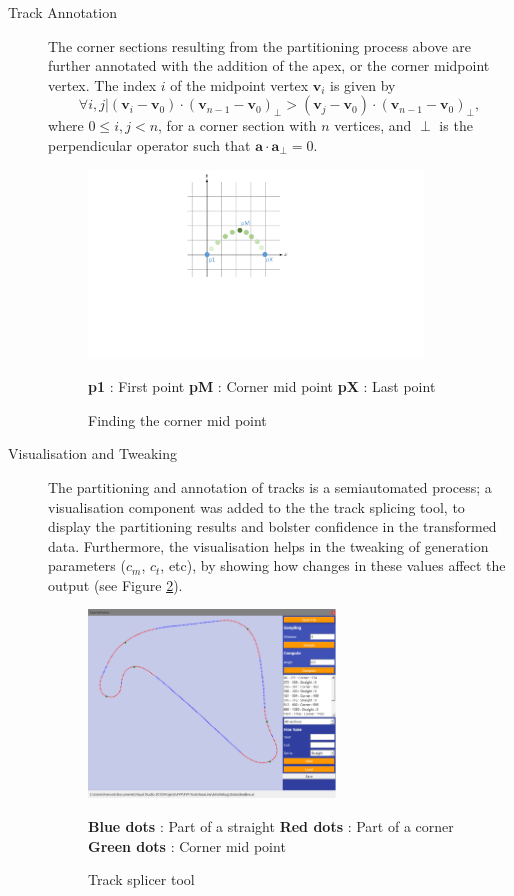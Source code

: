 \begin{description}
	\item [Track Annotation] The corner sections resulting from the partitioning process above are further annotated with the addition of the apex, or the corner midpoint vertex. The index $i$ of the midpoint vertex $\mathbf{v}_i$ is given by
	\begin{equation}
		\forall i,j | (\mathbf{v}_i - \mathbf{v}_0) \cdot (\mathbf{v}_{n-1} - \mathbf{v}_0)_{\perp} > (\mathbf{v}_j - \mathbf{v}_0) \cdot (\mathbf{v}_{n-1} - \mathbf{v}_0)_{\perp},  
	\end{equation} 
	where $0 \leq i,j < n$, for a corner section with $n$ vertices, and $\perp$ is the perpendicular operator such that $\mathbf{a} \cdot \mathbf{a}_{\perp} = 0$. 
	
	\begin{figure}[!htb]
		\centering
		\includegraphics[height=5cm]{diagrams/cornerMidPoint.pdf}
		\caption[Corner mid point]{Finding the corner mid point}
		\textbf{p1} : First point \textbf{pM} : Corner mid point \textbf{pX} : Last point
		\label{fig:diagram-cornerMidPoint}
	\end{figure}
	
	\item [Visualisation and Tweaking] The partitioning and annotation of tracks is a semiautomated process; a visualisation component was added to the the track splicing tool, to display the partitioning results and bolster confidence in the transformed data. Furthermore, the visualisation helps in the tweaking of generation parameters ($c_m$, $c_t$, etc), by showing how changes in these values affect the output (see Figure \ref{fig:TrackSplicerTool}). 
	
	\begin{figure}[!htb]
		\centering
		\includegraphics[height=5cm]{images/tracksplicertool}
		\caption{Track splicer tool}
		\textbf{Blue dots} : Part of a straight \textbf{Red dots} : Part of a corner \textbf{Green dots} : Corner mid point
		\label{fig:TrackSplicerTool}
	\end{figure}	
\end{description}

